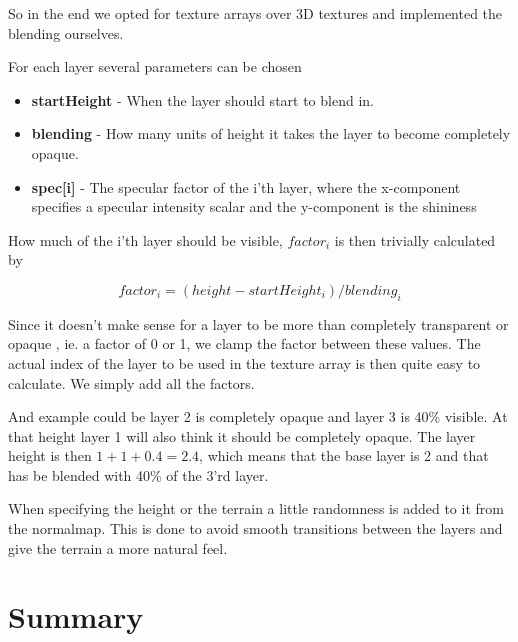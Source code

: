 So in the end we opted for texture arrays over 3D textures and
implemented the blending ourselves.

For each layer several parameters can be chosen

\newcommand{\layerProp}[2]{\item \textbf{#1} - #2}
\begin{itemize}
  \layerProp{startHeight}{When the layer should start to blend in.}
  \layerProp{blending}{How many units of height it takes the layer to
    become completely opaque.}
  \layerProp{spec[i]}{The specular factor of the i'th layer, where the
    x-component specifies a specular intensity scalar and the
    y-component is the shininess}
\end{itemize}

How much of the i'th layer should be visible, $factor_i$ is then
trivially calculated by

\begin{displaymath}
  factor_i = (height - startHeight_i) / blending_i
\end{displaymath}

Since it doesn't make sense for a layer to be more than completely
transparent or opaque , ie. a factor of 0 or 1, we clamp the factor
between these values. The actual index of the layer to be used in the
texture array is then quite easy to calculate. We simply add all the
factors. 

And example could be layer 2 is completely opaque and layer 3 is 40\%
visible. At that height layer 1 will also think it should be
completely opaque. The layer height is then $1 + 1 + 0.4 = 2.4$, which
means that the base layer is 2 and that has be blended with 40\% of
the 3'rd layer.


When specifying the height or the terrain a little randomness is added
to it from the normalmap. This is done to avoid smooth transitions
between the layers and give the terrain a more natural feel.

\section{Summary}









